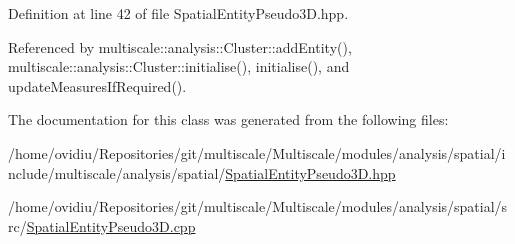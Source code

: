 Definition at line 42 of file Spatial\-Entity\-Pseudo3\-D.\-hpp.



Referenced by multiscale\-::analysis\-::\-Cluster\-::add\-Entity(), multiscale\-::analysis\-::\-Cluster\-::initialise(), initialise(), and update\-Measures\-If\-Required().



The documentation for this class was generated from the following files\-:\begin{DoxyCompactItemize}
\item 
/home/ovidiu/\-Repositories/git/multiscale/\-Multiscale/modules/analysis/spatial/include/multiscale/analysis/spatial/\hyperlink{SpatialEntityPseudo3D_8hpp}{Spatial\-Entity\-Pseudo3\-D.\-hpp}\item 
/home/ovidiu/\-Repositories/git/multiscale/\-Multiscale/modules/analysis/spatial/src/\hyperlink{SpatialEntityPseudo3D_8cpp}{Spatial\-Entity\-Pseudo3\-D.\-cpp}\end{DoxyCompactItemize}
